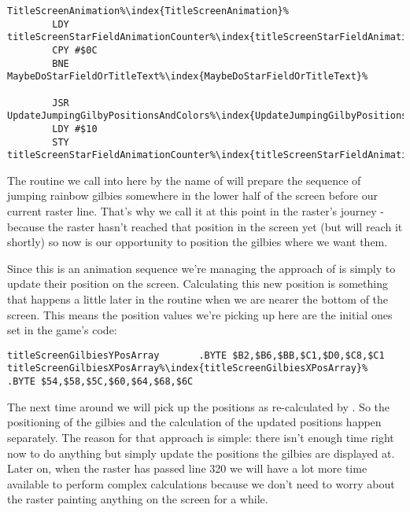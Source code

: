 \begin{lstlisting}[escapechar=\%]
TitleScreenAnimation%\index{TitleScreenAnimation}%
        LDY titleScreenStarFieldAnimationCounter%\index{titleScreenStarFieldAnimationCounter}%
        CPY #$0C
        BNE MaybeDoStarFieldOrTitleText%\index{MaybeDoStarFieldOrTitleText}%

        JSR UpdateJumpingGilbyPositionsAndColors%\index{UpdateJumpingGilbyPositionsAndColors}%
        LDY #$10
        STY titleScreenStarFieldAnimationCounter%\index{titleScreenStarFieldAnimationCounter}%
\end{lstlisting}

The routine we call into here by the name of  will prepare the sequence
of jumping rainbow gilbies somewhere in the lower half of the screen before our current raster line. That's why we
call it at this point in the raster's journey - because the raster hasn't reached that position in the screen yet
(but will reach it shortly) so now is our opportunity to position the gilbies where we want them. 

Since this is an animation sequence we're managing the approach of  is
simply to update their position on the screen. Calculating this new position is something that happens a little later
in the routine  when we are nearer the bottom of the screen. This means the
position values we're picking up here are the initial ones set in the game's code:

\begin{lstlisting}[escapechar=\%]
titleScreenGilbiesYPosArray       .BYTE $B2,$B6,$BB,$C1,$D0,$C8,$C1
titleScreenGilbiesXPosArray%\index{titleScreenGilbiesXPosArray}%       .BYTE $54,$58,$5C,$60,$64,$68,$6C
\end{lstlisting}

The next time around we will pick up the positions as re-calculated by .
So the positioning of the gilbies and the calculation of the updated positions happen separately. The reason
for that approach is simple: there isn't enough time right now to do anything but simply update the positions the gilbies
are displayed at.
Later on, when the raster has passed line 320 we will have a lot more time available to perform complex calculations
because we don't need to worry about the raster painting anything on the screen for a while.

